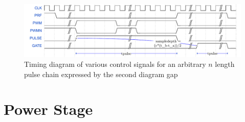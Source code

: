 \begin{figure}[htbp]
	\centering
	\includegraphics[width=\textwidth]{Figures/3_wavedrom.pdf}
	\caption{Timing diagram of various control signals for an arbitrary $n$ length pulse chain expressed by the second diagram gap}
	\label{fig:3_pulse_timing_diagram}
\end{figure}

\section{Power Stage}
%
